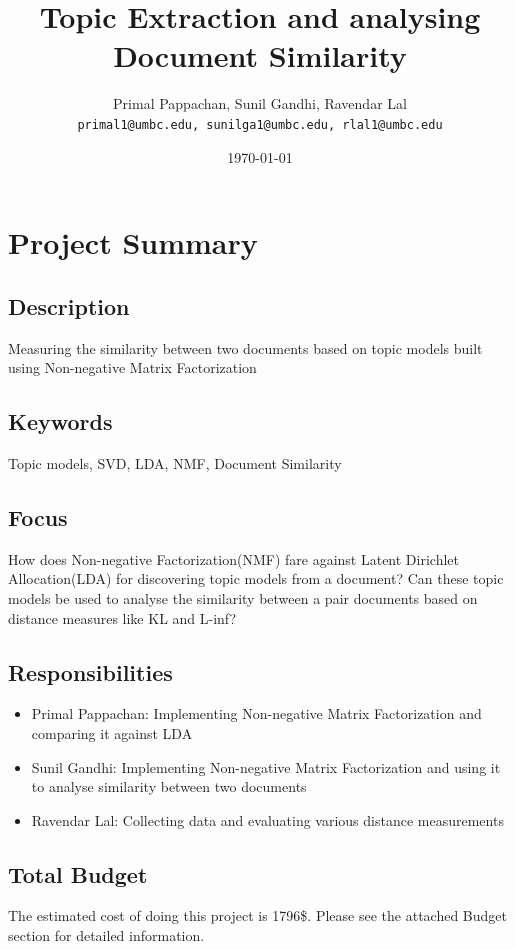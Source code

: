 \documentclass[a4paper,11pt]{article}
\begin{document}

\title{Topic Extraction and analysing Document Similarity}
\author{Primal Pappachan, Sunil Gandhi, Ravendar Lal \\ 
\texttt{primal1@umbc.edu, sunilga1@umbc.edu, rlal1@umbc.edu}}
\date{\today}
\maketitle


\section{Project Summary}
\subsection{Description}
Measuring the similarity between two documents based on topic models built using Non-negative Matrix Factorization 
\subsection{Keywords}
Topic models, SVD, LDA, NMF, Document Similarity 
\subsection{Focus}
How does Non-negative Factorization(NMF) fare against Latent Dirichlet Allocation(LDA) for discovering topic models from a document? Can these topic models be used to analyse the similarity between a pair documents based on distance measures like KL and L-inf?
\subsection{Responsibilities}
\begin{itemize}
\item Primal Pappachan: Implementing Non-negative Matrix Factorization and comparing it against LDA
\item Sunil Gandhi: Implementing Non-negative Matrix Factorization and using it to analyse similarity between two documents 
\item Ravendar Lal: Collecting data and evaluating various distance measurements
\end{itemize}
\subsection{Total Budget} 
The estimated cost of doing this project is 1796\$. Please see the attached Budget section for detailed information.
\end{document}
